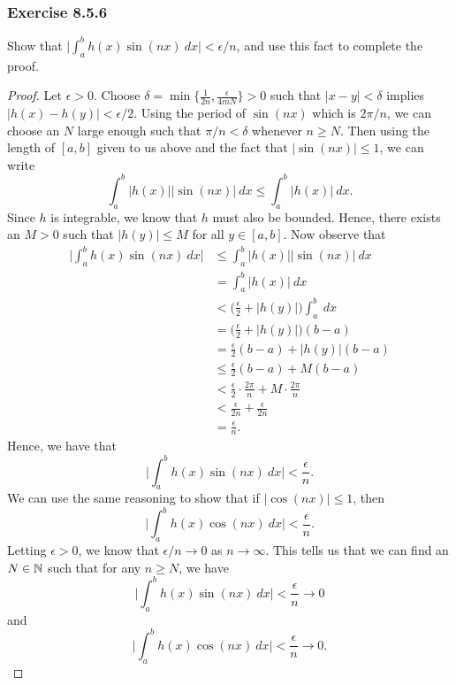 \subsubsection{Exercise 8.5.6} Show that \( \Big| \int_{ a }^{ b } h(x) \sin(nx) \ dx  \Big| < \epsilon / n  \), and use this fact to complete the proof.

\begin{proof}
    Let \( \epsilon > 0  \). Choose \( \delta = \min \{ \frac{ 1 }{ 2n } , \frac{ \epsilon  }{ 4mN  }   \} > 0   \) such that \(  | x - y  |  < \delta  \) implies \( | h(x) - h(y)  | < \epsilon / 2  \). Using the period of \( \sin(nx)  \) which is \( 2 \pi / n  \), we can choose an \( N  \) large enough such that \( \pi / n  < \delta  \) whenever \( n \geq N  \). Then using the length of \([a,b]   \) given to us above and the fact that \( | \sin(nx) | \leq 1  \), we can write  
    \[  \int_{ a }^{ b } | h(x)  |  | \sin(nx) |  \ dx \leq \int_{ a }^{ b } | h(x) |  \ dx. \]
    Since \( h  \) is integrable, we know that \( h  \) must also be bounded. Hence, there exists an \( M > 0  \) such that \( | h(y) | \leq M  \) for all \( y \in [a,b] \). Now observe that  
    \begin{align*}
        \Big| \int_{ a }^{ b } h(x) \sin(nx) \ dx  \Big| &\leq \int_{ a }^{ b } | h(x)  |  | \sin(nx) |  \ dx \\
                                                         &= \int_{ a }^{ b } | h(x) |  \ dx \\
                                                         &< \Big( \frac{ \epsilon  }{ 2 } + | h(y) |  \Big) \int_{ a }^{ b }  \ dx \\
                                                         &= \Big( \frac{ \epsilon  }{ 2 } + | h(y) |  \Big)(b-a) \\
                                                         &= \frac{ \epsilon  }{ 2 }  (b-a) + | h(y) | (b-a) \\
                                                         &\leq \frac{ \epsilon  }{ 2 } (b-a) + M (b-a) \\
                                                         &< \frac{ \epsilon  }{ 2  } \cdot \frac{ 2 \pi  }{ n }  + M \cdot \frac{ 2 \pi  }{ n } \\
                                                         &< \frac{ \epsilon  }{ 2n }  + \frac{ \epsilon  }{ 2  n  } \\
                                                         &= \frac{ \epsilon  }{ n }.
    \end{align*}
    Hence, we have that 
    \[  \Big| \int_{ a }^{ b } h(x) \sin(nx) \ dx \Big| < \frac{ \epsilon  }{ n }. \] We can use the same reasoning to show that if \( | \cos(nx) | \leq 1  \), then 
    \[  \Big| \int_{ a }^{ b } h(x) \cos(nx) \ dx \Big|  < \frac{ \epsilon  }{ n }. \]
    Letting \( \epsilon > 0  \), we know that \( \epsilon / n  \to 0  \) as \( n \to \infty  \). This tells us that we can find an \( N \in \mathbb{N}  \) such that for any \( n \geq N  \), we have 
    \[  \Big| \int_{ a }^{ b } h(x) \sin(nx) \ dx \Big| < \frac{ \epsilon  }{ n }  \to 0  \]
    and 
    \[  \Big| \int_{ a }^{ b } h(x) \cos(nx)  \ dx \Big| < \frac{ \epsilon  }{ n } \to 0. \]
\end{proof}

